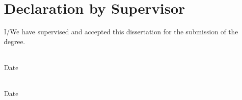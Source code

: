 \chapter*{Declaration by Supervisor}

\begin{flushleft}
	I/We have supervised and accepted this dissertation for the submission of the degree. \\

	\vspace{15mm}
	
	{\makebox[6.5cm]{\dotfill}} \hfill {\makebox[5cm]{\dotfill}}  \\ 
	\guideA \hfill Date \\
	
	
	\vspace{15mm}
	
	{\makebox[6.5cm]{\dotfill}} \hfill {\makebox[5cm]{\dotfill}}  \\ 
	\guideB \hfill Date \\
	
\end{flushleft}
